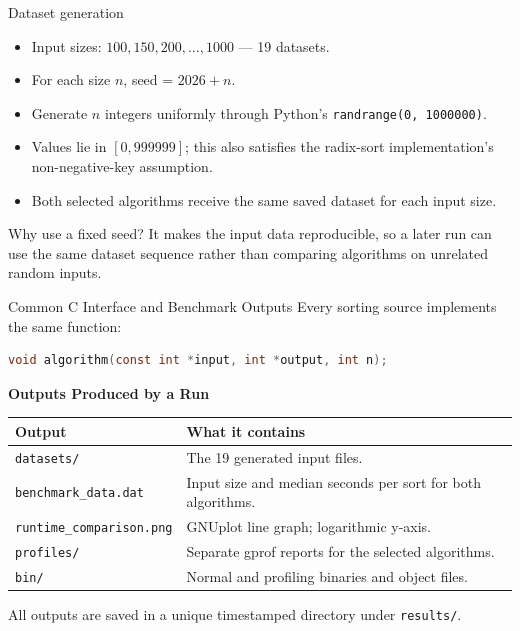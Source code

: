 \documentclass[aspectratio=169,11pt]{beamer}
\begin{document}
\begin{frame}{Dataset generation}
\begin{itemize}
\item Input sizes: $100,150,200,\ldots,1000$ — 19 datasets.
\item For each size $n$, seed = $2026+n$.
\item Generate $n$ integers uniformly through Python's \texttt{randrange(0, 1000000)}.
\item Values lie in $[0,999999]$; this also satisfies the radix-sort implementation's non-negative-key assumption.
\item Both selected algorithms receive the same saved dataset for each input size.
\end{itemize}
\begin{block}{Why use a fixed seed?}
It makes the input data reproducible, so a later run can use the same dataset sequence rather than comparing algorithms on unrelated random inputs.
\end{block}
\end{frame}

\begin{frame}[fragile]{Common C Interface and Benchmark Outputs}
Every sorting source implements the same function:

\begin{lstlisting}[language=C]
void algorithm(const int *input, int *output, int n);
\end{lstlisting}

\vspace{0.3cm}

\textbf{Outputs Produced by a Run}

\begin{tabularx}{\textwidth}{lX}
\toprule
\textbf{Output} & \textbf{What it contains}\\
\midrule
\texttt{datasets/} & The 19 generated input files.\\
\texttt{benchmark\_data.dat} & Input size and median seconds per sort for both algorithms.\\
\texttt{runtime\_comparison.png} & GNUplot line graph; logarithmic y-axis.\\
\texttt{profiles/} & Separate gprof reports for the selected algorithms.\\
\texttt{bin/} & Normal and profiling binaries and object files.\\
\bottomrule
\end{tabularx}

\vspace{0.3cm}

All outputs are saved in a unique timestamped directory under
\texttt{results/}.

\end{frame}
\end{document}

